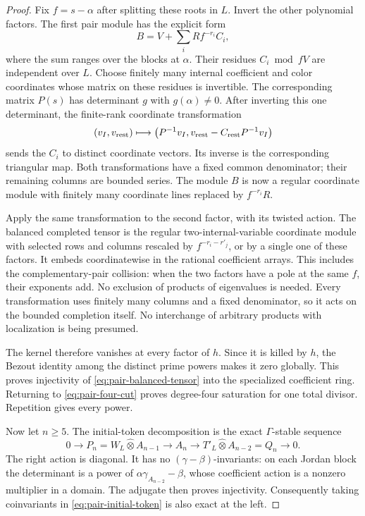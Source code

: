 \begin{proof}
Fix $f=s-\alpha$ after splitting these roots in $L$.
Invert the other polynomial factors. The first pair
module has the explicit form
\[
              B=V+\sum_i R f^{-r_i}C_i,
\]
where the sum ranges over the blocks at $\alpha$.
Their residues $C_i\bmod fV$ are independent over $L$.
Choose finitely many internal coefficient and color
coordinates whose matrix on these residues is
invertible. The corresponding matrix $P(s)$ has
determinant $g$ with $g(\alpha)\ne0$. After inverting
this one determinant, the finite-rank coordinate
transformation
\[
 (v_I,v_{\rm rest})\longmapsto
 \bigl(P^{-1}v_I,
               v_{\rm rest}-C_{\rm rest}P^{-1}v_I\bigr)
\]
sends the $C_i$ to distinct coordinate vectors.
Its inverse is the corresponding triangular map.
Both transformations have a fixed common denominator;
their remaining columns are bounded series. The module
$B$ is now a regular coordinate module with finitely
many coordinate lines replaced by $f^{-r_i}R$.

Apply the same transformation to the second factor,
with its twisted action. The balanced completed tensor
is the regular two-internal-variable coordinate module
with selected rows and columns rescaled by
$f^{-r_i-r'_j}$, or by a single one of these factors.
It embeds coordinatewise in the rational coefficient
arrays. This includes the complementary-pair collision:
when the two factors have a pole at the same $f$, their
exponents add. No exclusion of products of eigenvalues
is needed. Every transformation uses finitely many
columns and a fixed denominator, so it acts on the
bounded completion itself. No interchange of arbitrary
products with localization is being presumed.

The kernel therefore vanishes at every factor of $h$.
Since it is killed by $h$, the Bezout identity among
the distinct prime powers makes it zero globally.
This proves injectivity of
\eqref{eq:pair-balanced-tensor} into the specialized
coefficient ring. Returning to
\eqref{eq:pair-four-cut} proves degree-four saturation
for one total divisor. Repetition gives every power.

Now let $n\geq5$. The initial-token decomposition is
the exact $\Gamma$-stable sequence
\begin{equation}\label{eq:pair-initial-token}
 0\longrightarrow P_n=W_L\widehat\otimes A_{n-1}
 \longrightarrow A_n
 \longrightarrow T'_L\widehat\otimes A_{n-2}=Q_n
 \longrightarrow0.
\end{equation}
The right action is diagonal. It has no
$(\gamma-\beta)$-invariants: on each Jordan block
the determinant is a power of
$\alpha\gamma_{A_{n-2}}-\beta$, whose coefficient
action is a nonzero multiplier in a domain.
The adjugate then proves injectivity. Consequently
taking coinvariants in \eqref{eq:pair-initial-token}
is also exact at the left.


\end{proof}
